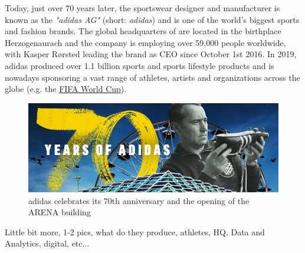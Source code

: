 Today, just over 70 years later, the sportswear designer and manufacturer is known as the \textit{"adidas AG"} (short: \textit{adidas}) and is one of the world's biggest sports and fashion brands. The global headquarters of are located in the birthplace Herzogenaurach and the company is employing over 59,000 people worldwide, with Kasper R\o rsted leading the brand as CEO since October 1st 2016. In 2019, adidas produced over 1.1 billion sports and sports lifestyle products and is nowadays sponsoring a vast range of athletes, artists and organizations across the globe (e.g. the  \href{http://https://www.fifa.com/worldcup/}{FIFA World Cup\texttrademark}).

\begin{figure}[H]
\centering
  \includegraphics[width=.95\linewidth]{figures/adidas_70_years.jpg}
  \caption{adidas celebrates its 70th anniversary and the opening of the ARENA building \citep{adidas70years}}
  \label{fig:adidas_70_years}
\end{figure}


Little bit more, 1-2 pics, what do they produce, athletes, HQ, Data and Analytics, digital, etc...